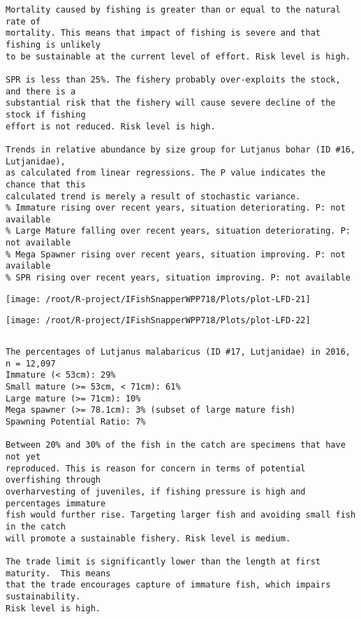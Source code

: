 \documentclass{report}\usepackage[]{graphicx}\usepackage[]{color}
\makeatletter
\def\maxwidth{ %
  \ifdim\Gin@nat@width>\linewidth
    \linewidth
  \else
    \Gin@nat@width
  \fi
}
\newenvironment{kframe}{%
 \def\at@end@of@kframe{}%
 \ifinner\ifhmode%
  \def\at@end@of@kframe{\end{minipage}}%
  \begin{minipage}{\columnwidth}%
 \fi\fi%
 \def\FrameCommand##1{\hskip\@totalleftmargin \hskip-\fboxsep
 \colorbox{shadecolor}{##1}\hskip-\fboxsep
     \hskip-\linewidth \hskip-\@totalleftmargin \hskip\columnwidth}%
 \MakeFramed {\advance\hsize-\width
   \@totalleftmargin\z@ \linewidth\hsize
   \@setminipage}}%
 {\par\unskip\endMakeFramed%
 \at@end@of@kframe}
\newenvironment{knitrout}{}{} %
\makeatother
\begin{document}
\begin{knitrout}
\begin{kframe}
\begin{verbatim}
Mortality caused by fishing is greater than or equal to the natural rate of
mortality. This means that impact of fishing is severe and that fishing is unlikely
to be sustainable at the current level of effort. Risk level is high.
 
SPR is less than 25%. The fishery probably over-exploits the stock, and there is a
substantial risk that the fishery will cause severe decline of the stock if fishing
effort is not reduced. Risk level is high.
 
Trends in relative abundance by size group for Lutjanus bohar (ID #16, Lutjanidae),
as calculated from linear regressions. The P value indicates the chance that this
calculated trend is merely a result of stochastic variance.
% Immature rising over recent years, situation deteriorating. P: not available
% Large Mature falling over recent years, situation deteriorating. P: not available
% Mega Spawner rising over recent years, situation improving. P: not available
% SPR rising over recent years, situation improving. P: not available
\end{verbatim}
\end{kframe}
\texttt{[image: /root/R-project/IFishSnapperWPP718/Plots/plot-LFD-21]} 

\texttt{[image: /root/R-project/IFishSnapperWPP718/Plots/plot-LFD-22]} 
\begin{kframe}\begin{verbatim}
\end{verbatim}
\end{kframe}
\clearpage
\newpage
\begin{kframe}\begin{verbatim}The percentages of Lutjanus malabaricus (ID #17, Lutjanidae) in 2016, n = 12,097
Immature (< 53cm): 29%
Small mature (>= 53cm, < 71cm): 61%
Large mature (>= 71cm): 10%
Mega spawner (>= 78.1cm): 3% (subset of large mature fish)
Spawning Potential Ratio: 7%
 
Between 20% and 30% of the fish in the catch are specimens that have not yet
reproduced. This is reason for concern in terms of potential overfishing through
overharvesting of juveniles, if fishing pressure is high and percentages immature
fish would further rise. Targeting larger fish and avoiding small fish in the catch
will promote a sustainable fishery. Risk level is medium.

The trade limit is significantly lower than the length at first maturity.  This means
that the trade encourages capture of immature fish, which impairs sustainability.
Risk level is high.


\end{verbatim}
\end{kframe}
\end{knitrout}
\end{document}
